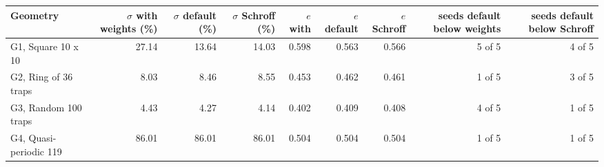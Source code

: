 \begin{tabular}{@{}l r r r r r r r r@{}}
\toprule
Geometry & $\sigma$ with weights (\%) & $\sigma$ default (\%) & $\sigma$ Schroff (\%) & $e$ with & $e$ default & $e$ Schroff & seeds default below weights & seeds default below Schroff\\
\midrule
G1, Square 10 x 10 & 27.14 & 13.64 & 14.03 & 0.598 & 0.563 & 0.566 & 5 of 5 & 4 of 5\\
G2, Ring of 36 traps & 8.03 & 8.46 & 8.55 & 0.453 & 0.462 & 0.461 & 1 of 5 & 3 of 5\\
G3, Random 100 traps & 4.43 & 4.27 & 4.14 & 0.402 & 0.409 & 0.408 & 4 of 5 & 1 of 5\\
G4, Quasi-periodic 119 & 86.01 & 86.01 & 86.01 & 0.504 & 0.504 & 0.504 & 1 of 5 & 1 of 5\\
\bottomrule
\end{tabular}
